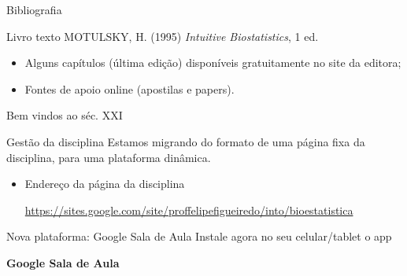 \documentclass{beamer}
\begin{document}

\begin{frame}{\scriptsize Bibliografia}
  \begin{block}{Livro texto}
    \footnotesize
    MOTULSKY, H. (1995) {\em Intuitive Biostatistics}, 1 ed.
  \end{block}
  \bigskip
  \begin{itemize}
    \scriptsize
  \item Alguns capítulos (última edição) disponíveis gratuitamente no site da editora;
  \item Fontes de apoio online (apostilas e papers).
  \end{itemize}
\end{frame}

\begin{frame}{\scriptsize Bem vindos ao séc. XXI}
  \begin{block}{Gestão da disciplina}
    \footnotesize
    Estamos migrando do formato de uma página fixa da disciplina, para uma plataforma dinâmica.
  \end{block}
  \begin{itemize}
    \footnotesize
  \item Endereço da página da disciplina

    \url{https://sites.google.com/site/proffelipefigueiredo/into/bioestatistica}
  \end{itemize}
  \begin{block}{Nova plataforma: Google Sala de Aula}
    \footnotesize
    Instale agora no seu celular/tablet o app

    \bigskip
    {\bf Google Sala de Aula}
  \end{block}
\end{frame}
\end{document}
